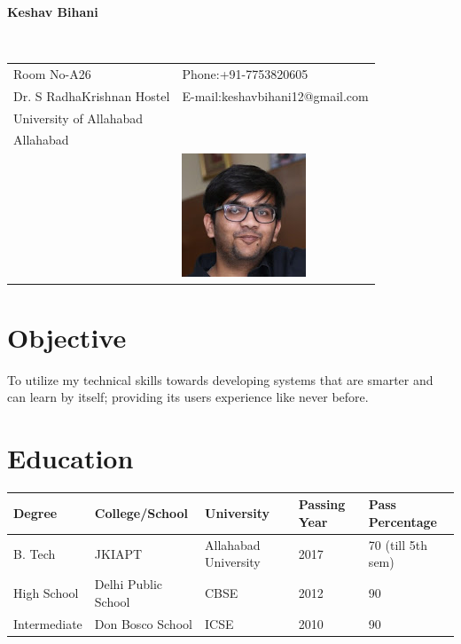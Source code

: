 \documentclass[12pt]{article}
\begin{document}
\vspace{0.5in}
\begin{center}\begin{large}\textbf{Keshav Bihani}\end{large}\end{center}\textbf{\hrulefill}\\

\begin{tabular}{@{}p{4in}p{3in}}
Room No-A26 & {Phone:}+91-7753820605 \\
Dr. S RadhaKrishnan Hostel & {E-mail:}keshavbihani12@gmail.com\\
University of Allahabad \\
Allahabad\\
& \includegraphics[scale=0.8]{keshav1.jpg}\\
\end{tabular}
\section*{Objective}
To utilize my technical skills towards developing systems that are smarter and can learn by itself; providing its users experience like never before.   
\section*{Education}
\begin{tabular}{|l|l|l|l|l|}
\hline
Degree & College/School & University & Passing Year & Pass Percentage\\
\hline
B. Tech & JKIAPT & Allahabad University & 2017 & 70 (till 5th sem)\\
\hline
High School & Delhi Public School & CBSE & 2012 & 90\\
\hline
Intermediate & Don Bosco School & ICSE & 2010 & 90\\
\hline
\end{tabular}
\end{document}
